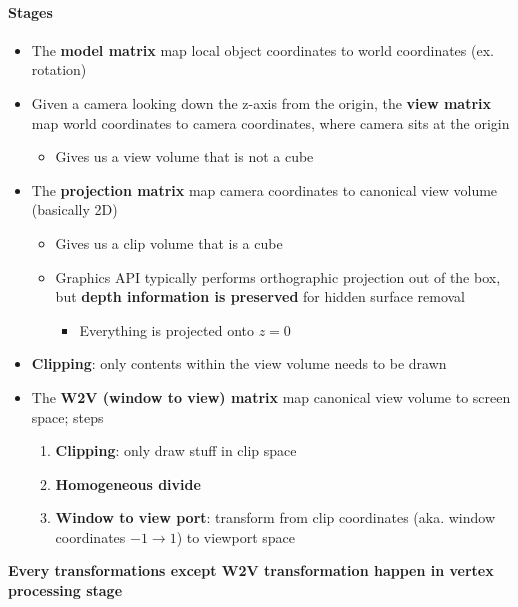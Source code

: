   \paragraph{Stages}
  \begin{itemize}
    \item The \textbf{model matrix} map local object coordinates to
    world coordinates (ex. rotation)
    \item Given a camera looking down the z-axis from the origin,
    the \textbf{view matrix} map world coordinates to camera coordinates,
    where camera sits at the origin
    \begin{itemize}
      \item Gives us a view volume that is not a cube
    \end{itemize}

    \item The \textbf{projection matrix} map camera coordinates to canonical
    view volume (basically 2D)
    \begin{itemize}
      \item Gives us a clip volume that is a cube
      \item Graphics API typically performs orthographic projection out of
      the box, but \textbf{depth information is preserved} for hidden surface
      removal
      \begin{itemize}
        \item Everything is projected onto $ z = 0 $
      \end{itemize}
    \end{itemize}

    \item \textbf{Clipping}: only contents within the view volume needs to be
    drawn
    \item The \textbf{W2V (window to view) matrix} map canonical view volume
    to screen space; steps
    \begin{enumerate}
      \item \textbf{Clipping}: only draw stuff in clip space
      \item \textbf{Homogeneous divide}
      \item \textbf{Window to view port}: transform from clip coordinates
      (aka. window coordinates $ -1 \to 1 $) to viewport space
    \end{enumerate}
  \end{itemize}

  \textbf{Every transformations except W2V transformation happen in vertex
  processing stage}

